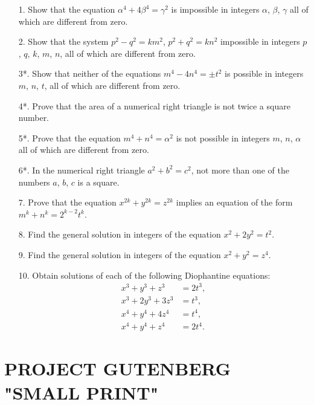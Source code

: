 \documentclass[oneside]{book}
\begin{document}
\begin{enumerate}
\item[1.] Show that the equation $\alpha^4 + 4\beta^4 = \gamma^2$ is
impossible in integers $\alpha$, $\beta$, $\gamma$ all of which are
different from zero.

\item[2.] Show that the system $p^2 - q^2 = km^2$, $p^2 + q^2 = kn^2$
impossible in integers $p$, $q$, $k$, $m$, $n$, all of which are
different from zero.

\item[3*.] Show that neither of the equations $m^4 - 4n^4 = \pm t^2$
is possible in integers $m$, $n$, $t$, all of which are different
from zero.

\item[4*.] Prove that the area of a numerical right triangle is not
twice a square number.

\item[5*.] Prove that the equation $m^4 + n^4 = \alpha^2$ is not
possible in integers $m$, $n$, $\alpha$ all of which are different
from zero.

\item[6*.] In the numerical right triangle $a^2 + b^2 = c^2$,
not more than one of the numbers $a$, $b$, $c$ is a square.

\item[7.] Prove that the equation $x^{2k} + y^{2k} = z^{2k}$ implies
an equation of the form $m^k + n^k = 2^{k-2} t^k$.

\item[8.] Find the general solution in integers of the equation
$x^2 + 2y^2 = t^2$.

\item[9.] Find the general solution in integers of the equation
$x^2 + y^2 = z^4$.

\item[10.] Obtain solutions of each of the following Diophantine
equations:
\begin{align*}
x^3 +  y^3 +  z^3 &= 2t^3, \\
x^3 + 2y^3 + 3z^3 &=  t^3, \\
x^4 +  y^4 + 4z^4 &=  t^4, \\
x^4 +  y^4 +  z^4 &= 2t^4.
\end{align*}
\end{enumerate}

\printindex


\newpage
\chapter{PROJECT GUTENBERG "SMALL PRINT"}
\small
{}
\end{document}
